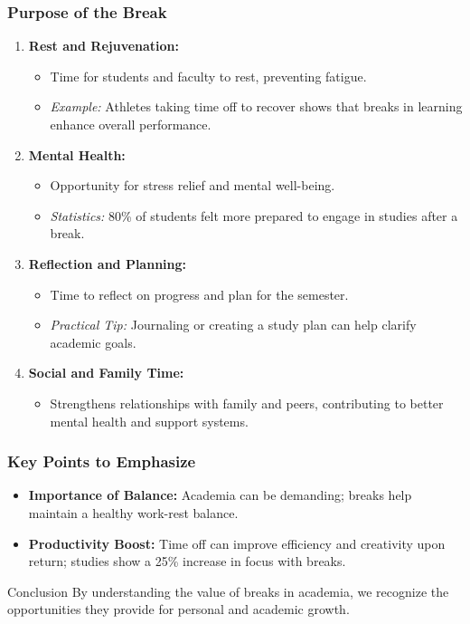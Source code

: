\documentclass[aspectratio=169]{beamer}
\begin{document}
\begin{frame}[fragile]
    \frametitle{Purpose of the Break}
    \begin{enumerate}
        \item \textbf{Rest and Rejuvenation:}
            \begin{itemize}
                \item Time for students and faculty to rest, preventing fatigue.
                \item \textit{Example:} Athletes taking time off to recover shows that breaks in learning enhance overall performance.
            \end{itemize}
        \item \textbf{Mental Health:}
            \begin{itemize}
                \item Opportunity for stress relief and mental well-being.
                \item \textit{Statistics:} 80\% of students felt more prepared to engage in studies after a break.
            \end{itemize}
        \item \textbf{Reflection and Planning:}
            \begin{itemize}
                \item Time to reflect on progress and plan for the semester.
                \item \textit{Practical Tip:} Journaling or creating a study plan can help clarify academic goals.
            \end{itemize}
        \item \textbf{Social and Family Time:}
            \begin{itemize}
                \item Strengthens relationships with family and peers, contributing to better mental health and support systems.
            \end{itemize}
    \end{enumerate}
\end{frame}

\begin{frame}[fragile]
    \frametitle{Key Points to Emphasize}
    \begin{itemize}
        \item \textbf{Importance of Balance:} Academia can be demanding; breaks help maintain a healthy work-rest balance.
        \item \textbf{Productivity Boost:} Time off can improve efficiency and creativity upon return; studies show a 25\% increase in focus with breaks.
    \end{itemize}
    \begin{block}{Conclusion}
        By understanding the value of breaks in academia, we recognize the opportunities they provide for personal and academic growth.
    \end{block}
\end{frame}
\end{document}
